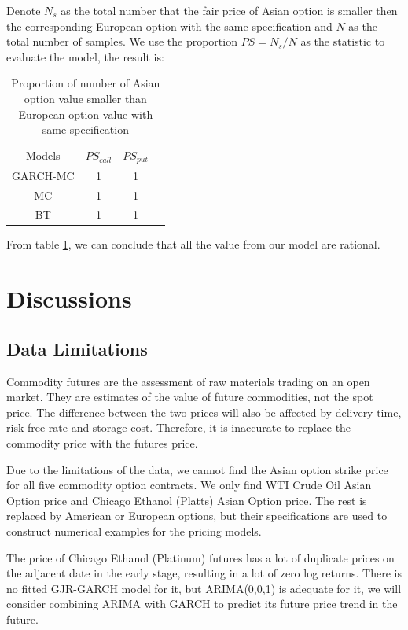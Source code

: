 \documentclass[10pt, a4paper, twocolumn]{article} %
\begin{document}
Denote $ N_s $ as the total number that the fair price of Asian option is smaller then the corresponding European option with the same specification and $ N $ as the total number of samples. We use the proportion $ PS = N_s / N $ as the statistic to evaluate the model, the result is:
\begin{table}[!ht]
\small
\centering
\begin{tabular}{cccc}
Models & $ PS_{call} $ & $ PS_{put} $ \\
GARCH-MC & 1 & 1 \\
MC & 1 & 1 \\
BT & 1 & 1 \\
\end{tabular}
\caption{Proportion of number of Asian option value smaller than European option value with same specification}
\label{PS}
\end{table}

From table \ref{PS}, we can conclude that all the value from our model are rational.


\section{Discussions}

\subsection{Data Limitations}
Commodity futures are the assessment of raw materials trading on an open market. They are estimates of the value of future commodities, not the spot price. The difference between the two prices will also be affected by delivery time, risk-free rate and storage cost. Therefore, it is inaccurate to replace the commodity price with the futures price.

Due to the limitations of the data, we cannot find the Asian option strike price for all five commodity option contracts. We only find WTI Crude Oil Asian Option price and Chicago Ethanol (Platts) Asian Option price. The rest is replaced by American or European options, but their specifications are used to construct numerical examples for the pricing models.

The price of Chicago Ethanol (Platinum) futures has a lot of duplicate prices on the adjacent date in the early stage, resulting in a lot of zero log returns. There is no fitted GJR-GARCH model for it, but ARIMA(0,0,1) is adequate for it, we will consider combining ARIMA with GARCH to predict its future price trend in the future.
\end{document}
